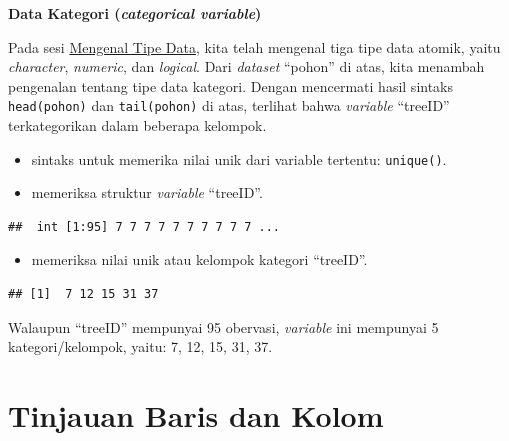 \documentclass[
  12pt,
  a4paper,
]{scrbook}
\newenvironment{Shaded}{\begin{snugshade}}{\end{snugshade}}
\newcommand{\CommentTok}[1]{\textcolor[rgb]{0.56,0.35,0.01}{\textit{#1}}}
\newcommand{\KeywordTok}[1]{\textcolor[rgb]{0.13,0.29,0.53}{\textbf{#1}}}
\newcommand{\NormalTok}[1]{#1}
\newcommand{\OperatorTok}[1]{\textcolor[rgb]{0.81,0.36,0.00}{\textbf{#1}}}
\providecommand{\tightlist}{%
  \setlength{\itemsep}{0pt}\setlength{\parskip}{0pt}}
\begin{document}
\newpage

\textbf{Data Kategori (\emph{categorical variable})}

Pada sesi \protect\hyperlink{tipedata}{Mengenal Tipe Data}, kita telah
mengenal tiga tipe data atomik, yaitu \emph{character}, \emph{numeric},
dan \emph{logical}. Dari \emph{dataset} ``pohon'' di atas, kita menambah
pengenalan tentang tipe data kategori. Dengan mencermati hasil sintaks
\texttt{head(pohon)} dan \texttt{tail(pohon)} di atas, terlihat bahwa
\emph{variable} ``treeID'' terkategorikan dalam beberapa kelompok.

\begin{itemize}
\tightlist
\item
  sintaks untuk memerika nilai unik dari variable tertentu:
  \texttt{unique()}.
\item
  memeriksa struktur \emph{variable} ``treeID''.
\end{itemize}

\begin{Shaded}
\end{Shaded}

\begin{verbatim}
##  int [1:95] 7 7 7 7 7 7 7 7 7 7 ...
\end{verbatim}

\begin{itemize}
\tightlist
\item
  memeriksa nilai unik atau kelompok kategori ``treeID''.
\end{itemize}

\begin{Shaded}
\end{Shaded}

\begin{verbatim}
## [1]  7 12 15 31 37
\end{verbatim}

Walaupun ``treeID'' mempunyai 95 obervasi, \emph{variable} ini mempunyai
5 kategori/kelompok, yaitu: 7, 12, 15, 31, 37.

\hypertarget{tinjauan-baris-dan-kolom}{%
\section{Tinjauan Baris dan Kolom}\label{tinjauan-baris-dan-kolom}}
\end{document}
